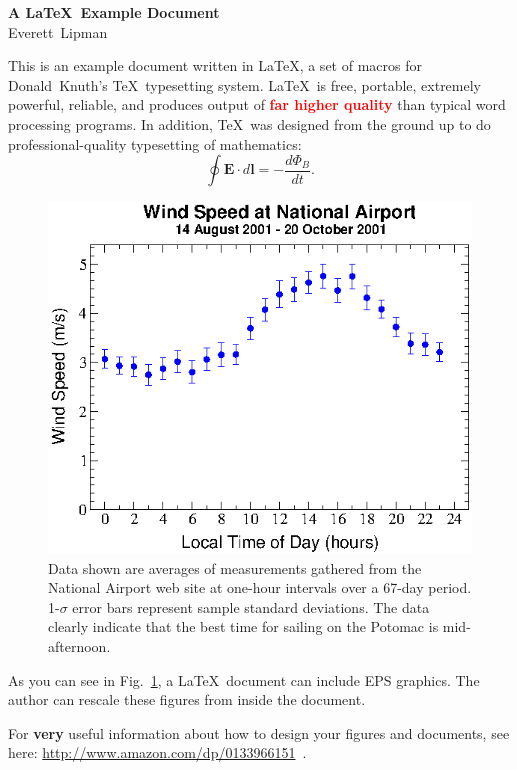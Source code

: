 \documentclass[12pt]{article}
\newcommand\thisis{A \LaTeX\ Example Document}
\newcommand\theauthor{Everett~Lipman}
\newcommand\sfb{\sffamily\bfseries}
\newcommand\red[1]{\textcolor{red}{\sffamily\bfseries #1}}
\begin{document}
\thispagestyle{firstpg}

\noindent
{\sffamily\bfseries\huge \thisis}\\

\noindent
{\large\sffamily \theauthor}

\vspace*{20bp}

\noindent
This is an example document written in \LaTeX, a set
of macros for Donald~Knuth's \TeX\ typesetting system.
\LaTeX\ is free, portable, extremely powerful, reliable,
and produces output of \red{far higher quality} than typical
word processing programs.  In addition, \TeX\ was designed
from the ground up to do professional-quality typesetting
of mathematics:
\[\oint \mathbf{E}\cdot d\mathbf{l} = -\frac{d\Phi_B}{dt}.\]

\begin{figure}[h]
\begin{center}
\includegraphics[width=300bp]{wind_si}
\vspace{-18bp}
\end{center}
\caption[]{\label{fig:wind}\small
Data shown are averages of measurements gathered from
the National Airport web site at one-hour intervals over
a 67-day period.  1-$\sigma$ error bars represent sample
standard deviations.  The data clearly indicate that the
best time for sailing on the Potomac is mid-afternoon.
}
\end{figure}

As you can see in Fig.~\ref{fig:wind}, a \LaTeX\ document
can include EPS graphics.  The author can rescale these
figures from inside the document.

For {\sfb very} useful information about how to design your
figures and documents, see here:
\url{http://www.amazon.com/dp/0133966151}~.
\end{document}

